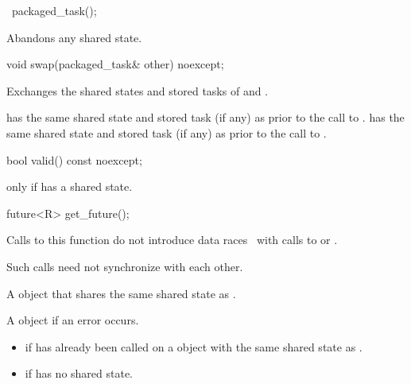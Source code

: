 %
\begin{itemdecl}
~packaged_task();
\end{itemdecl}

\begin{itemdescr}
\pnum
\effects
Abandons any shared state.
\end{itemdescr}

%
\begin{itemdecl}
void swap(packaged_task& other) noexcept;
\end{itemdecl}

\begin{itemdescr}
\pnum
\effects
Exchanges the shared states and stored tasks of  and .

\pnum
\ensures
{} has the same shared state
and stored task (if any) as 
prior to the call to .  has the same shared state
and stored task (if any)
as  prior to the call to .
\end{itemdescr}

%
\begin{itemdecl}
bool valid() const noexcept;
\end{itemdecl}

\begin{itemdescr}
\pnum
\returns
{} only if  has a shared state.
\end{itemdescr}

%
\begin{itemdecl}
future<R> get_future();
\end{itemdecl}

\begin{itemdescr}
\pnum
\sync
Calls to this function do not introduce
data races~ with calls to
 or
.
\begin{note}
Such calls need not synchronize with each other.
\end{note}

\pnum
\returns
A  object that shares the same shared state as .

\pnum
\throws
A  object if an error occurs.

\pnum
\errors
\begin{itemize}
\item {} if  has already been called on
a  object with the same shared state as .
\item {} if  has no shared state.
\end{itemize}
\end{itemdescr}

